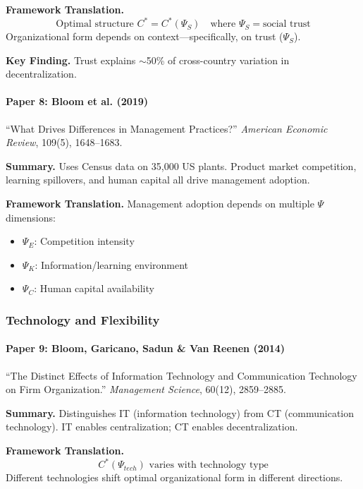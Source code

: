 \textbf{Framework Translation.}
\begin{equation}
  \text{Optimal structure } C^* = C^*(\Psi_S) \quad \text{where } \Psi_S = \text{social trust}
\end{equation}
Organizational form depends on context---specifically, on trust ($\Psi_S$).

\textbf{Key Finding.}
Trust explains $\sim$50\% of cross-country variation in decentralization.

\paragraph{Paper 8: Bloom et al. (2019)}

``What Drives Differences in Management Practices?''
\textit{American Economic Review}, 109(5), 1648--1683.

\textbf{Summary.}
Uses Census data on 35,000 US plants. Product market competition, learning spillovers,
and human capital all drive management adoption.

\textbf{Framework Translation.}
Management adoption depends on multiple $\Psi$ dimensions:
\begin{itemize}
  \item $\Psi_E$: Competition intensity
  \item $\Psi_K$: Information/learning environment
  \item $\Psi_C$: Human capital availability
\end{itemize}

\subsubsection{Technology and Flexibility}

\paragraph{Paper 9: Bloom, Garicano, Sadun \& Van Reenen (2014)}

``The Distinct Effects of Information Technology and Communication Technology on Firm Organization.''
\textit{Management Science}, 60(12), 2859--2885.

\textbf{Summary.}
Distinguishes IT (information technology) from CT (communication technology).
IT enables centralization; CT enables decentralization.

\textbf{Framework Translation.}
\begin{equation}
  C^*(\Psi_{tech}) \text{ varies with technology type}
\end{equation}
Different technologies shift optimal organizational form in different directions.

